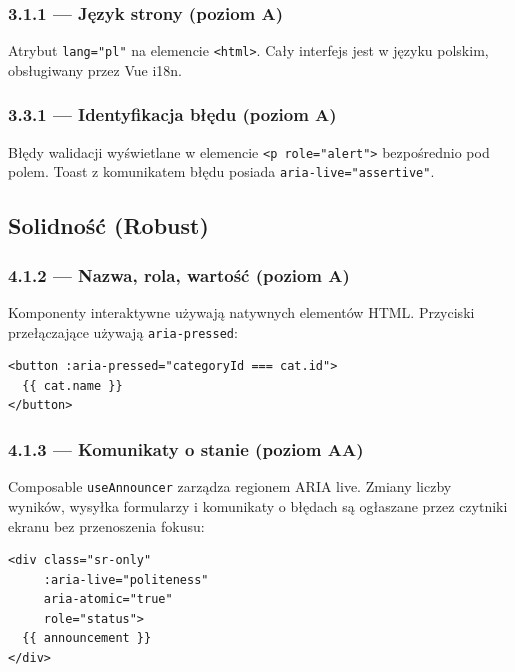 \documentclass[12pt, a4paper]{article}
\begin{document}
\subsubsection{3.1.1 — Język strony (poziom A)}

Atrybut \texttt{lang="pl"} na elemencie \texttt{<html>}. Cały interfejs jest w języku
polskim, obsługiwany przez Vue i18n.

\subsubsection{3.3.1 — Identyfikacja błędu (poziom A)}

Błędy walidacji wyświetlane w elemencie \texttt{<p role="alert">} bezpośrednio
pod polem. Toast z komunikatem błędu posiada \texttt{aria-live="assertive"}.

\subsection{Solidność (Robust)}

\subsubsection{4.1.2 — Nazwa, rola, wartość (poziom A)}

Komponenty interaktywne używają natywnych elementów HTML. Przyciski przełączające
używają \texttt{aria-pressed}:

\begin{lstlisting}[style=html, caption={Użycie aria-pressed na chipach filtrów}]
<button :aria-pressed="categoryId === cat.id">
  {{ cat.name }}
</button>
\end{lstlisting}

\subsubsection{4.1.3 — Komunikaty o stanie (poziom AA)}

Composable \texttt{useAnnouncer} zarządza regionem ARIA live. Zmiany liczby wyników,
wysyłka formularzy i komunikaty o błędach są ogłaszane przez czytniki ekranu
bez przenoszenia fokusu:

\begin{lstlisting}[style=html, caption={Region ARIA live w App.vue}]
<div class="sr-only"
     :aria-live="politeness"
     aria-atomic="true"
     role="status">
  {{ announcement }}
</div>
\end{lstlisting}
\end{document}
